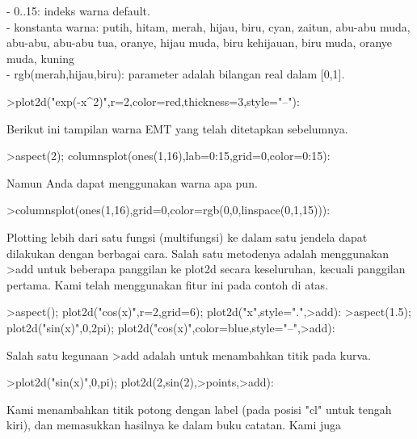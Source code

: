 \documentclass[a4paper,10pt]{article}
\begin{document}
\begin{eulernotebook}
\begin{eulercomment}
\begin{eulercomment}
\begin{eulercomment}
\begin{eulercomment}
\begin{eulercomment}
\begin{eulercomment}
\begin{eulercomment}
\begin{eulercomment}
\begin{eulercomment}
\begin{eulercomment}
\begin{eulercomment}
\begin{eulercomment}
\begin{eulercomment}
- 0..15: indeks warna default.\\
- konstanta warna: putih, hitam, merah, hijau, biru, cyan, zaitun,
abu-abu muda, abu-abu, abu-abu tua, oranye, hijau muda, biru
kehijauan, biru muda, oranye muda, kuning\\
- rgb(merah,hijau,biru): parameter adalah bilangan real dalam [0,1].
\end{eulercomment}
\begin{eulerprompt}
>plot2d("exp(-x^2)",r=2,color=red,thickness=3,style="--"):
\end{eulerprompt}
\begin{eulercomment}
Berikut ini tampilan warna EMT yang telah ditetapkan sebelumnya.
\end{eulercomment}
\begin{eulerprompt}
>aspect(2); columnsplot(ones(1,16),lab=0:15,grid=0,color=0:15):
\end{eulerprompt}
\begin{eulercomment}
Namun Anda dapat menggunakan warna apa pun.
\end{eulercomment}
\begin{eulerprompt}
>columnsplot(ones(1,16),grid=0,color=rgb(0,0,linspace(0,1,15))):
\end{eulerprompt}
\begin{eulercomment}
Plotting lebih dari satu fungsi (multifungsi) ke dalam satu jendela
dapat dilakukan dengan berbagai cara. Salah satu metodenya adalah
menggunakan \textgreater{}add untuk beberapa panggilan ke plot2d secara
keseluruhan, kecuali panggilan pertama. Kami telah menggunakan fitur
ini pada contoh di atas.
\end{eulercomment}
\begin{eulerprompt}
>aspect(); plot2d("cos(x)",r=2,grid=6); plot2d("x",style=".",>add):
>aspect(1.5); plot2d("sin(x)",0,2pi); plot2d("cos(x)",color=blue,style="--",>add):
\end{eulerprompt}
\begin{eulercomment}
Salah satu kegunaan \textgreater{}add adalah untuk menambahkan titik pada kurva.
\end{eulercomment}
\begin{eulerprompt}
>plot2d("sin(x)",0,pi); plot2d(2,sin(2),>points,>add):
\end{eulerprompt}
\begin{eulercomment}
Kami menambahkan titik potong dengan label (pada posisi "cl" untuk
tengah kiri), dan memasukkan hasilnya ke dalam buku catatan. Kami juga

\end{eulercomment}
\end{eulercomment}
\end{eulercomment}
\end{eulercomment}
\end{eulercomment}
\end{eulercomment}
\end{eulercomment}
\end{eulercomment}
\end{eulercomment}
\end{eulercomment}
\end{eulercomment}
\end{eulercomment}
\end{eulercomment}
\end{eulernotebook}
\end{document}

